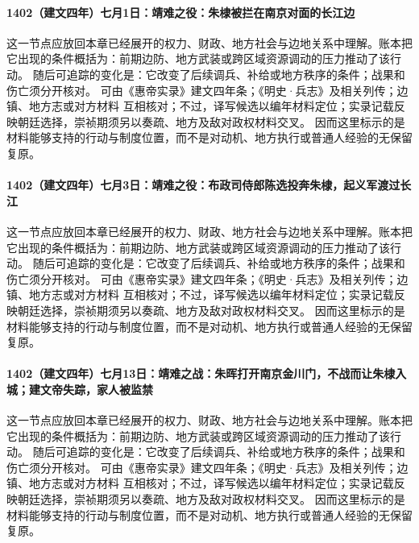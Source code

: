 \paragraph{1402（建文四年）七月1日：靖难之役：朱棣被拦在南京对面的长江边} 这一节点应放回本章已经展开的权力、财政、地方社会与边地关系中理解。账本把它出现的条件概括为：前期边防、地方武装或跨区域资源调动的压力推动了该行动。 随后可追踪的变化是：它改变了后续调兵、补给或地方秩序的条件；战果和伤亡须分开核对。 可由《惠帝实录》建文四年条；《明史·兵志》及相关列传；边镇、地方志或对方材料 互相核对；不过，译写候选以编年材料定位；实录记载反映朝廷选择，崇祯期须另以奏疏、地方及敌对政权材料交叉。 因而这里标示的是材料能够支持的行动与制度位置，而不是对动机、地方执行或普通人经验的无保留复原。

\paragraph{1402（建文四年）七月3日：靖难之役：布政司侍郎陈选投奔朱棣，起义军渡过长江} 这一节点应放回本章已经展开的权力、财政、地方社会与边地关系中理解。账本把它出现的条件概括为：前期边防、地方武装或跨区域资源调动的压力推动了该行动。 随后可追踪的变化是：它改变了后续调兵、补给或地方秩序的条件；战果和伤亡须分开核对。 可由《惠帝实录》建文四年条；《明史·兵志》及相关列传；边镇、地方志或对方材料 互相核对；不过，译写候选以编年材料定位；实录记载反映朝廷选择，崇祯期须另以奏疏、地方及敌对政权材料交叉。 因而这里标示的是材料能够支持的行动与制度位置，而不是对动机、地方执行或普通人经验的无保留复原。

\paragraph{1402（建文四年）七月13日：靖难之战：朱晖打开南京金川门，不战而让朱棣入城；建文帝失踪，家人被监禁} 这一节点应放回本章已经展开的权力、财政、地方社会与边地关系中理解。账本把它出现的条件概括为：前期边防、地方武装或跨区域资源调动的压力推动了该行动。 随后可追踪的变化是：它改变了后续调兵、补给或地方秩序的条件；战果和伤亡须分开核对。 可由《惠帝实录》建文四年条；《明史·兵志》及相关列传；边镇、地方志或对方材料 互相核对；不过，译写候选以编年材料定位；实录记载反映朝廷选择，崇祯期须另以奏疏、地方及敌对政权材料交叉。 因而这里标示的是材料能够支持的行动与制度位置，而不是对动机、地方执行或普通人经验的无保留复原。

